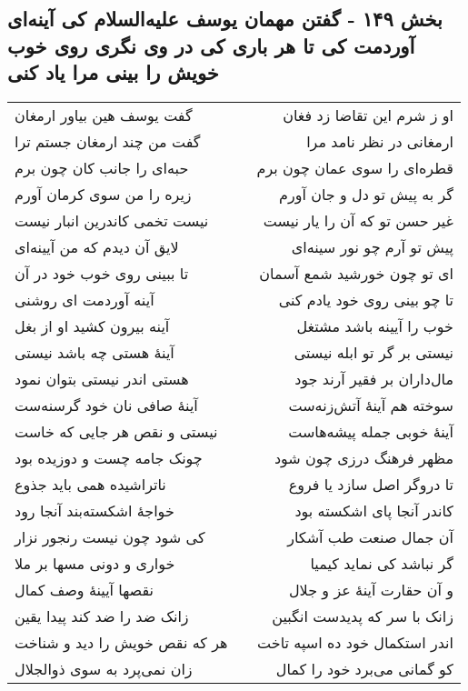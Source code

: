 \begin{center}
\section*{بخش ۱۴۹ - گفتن مهمان یوسف علیه‌السلام کی آینه‌ای آوردمت کی تا هر باری کی در وی نگری روی خوب خویش را بینی مرا یاد کنی}
\label{sec:sh149}
\begin{longtable}{l p{0.5cm} r}
گفت یوسف هین بیاور ارمغان
&&
او ز شرم این تقاضا زد فغان
\\
گفت من چند ارمغان جستم ترا
&&
ارمغانی در نظر نامد مرا
\\
حبه‌ای را جانب کان چون برم
&&
قطره‌ای را سوی عمان چون برم
\\
زیره را من سوی کرمان آورم
&&
گر به پیش تو دل و جان آورم
\\
نیست تخمی کاندرین انبار نیست
&&
غیر حسن تو که آن را یار نیست
\\
لایق آن دیدم که من آیینه‌ای
&&
پیش تو آرم چو نور سینه‌ای
\\
تا ببینی روی خوب خود در آن
&&
ای تو چون خورشید شمع آسمان
\\
آینه آوردمت ای روشنی
&&
تا چو بینی روی خود یادم کنی
\\
آینه بیرون کشید او از بغل
&&
خوب را آیینه باشد مشتغل
\\
آینهٔ هستی چه باشد نیستی
&&
نیستی بر گر تو ابله نیستی
\\
هستی اندر نیستی بتوان نمود
&&
مال‌داران بر فقیر آرند جود
\\
آینهٔ صافی نان خود گرسنه‌ست
&&
سوخته هم آینهٔ آتش‌زنه‌ست
\\
نیستی و نقص هر جایی که خاست
&&
آینهٔ خوبی جمله پیشه‌هاست
\\
چونک جامه چست و دوزیده بود
&&
مظهر فرهنگ درزی چون شود
\\
ناتراشیده همی باید جذوع
&&
تا دروگر اصل سازد یا فروع
\\
خواجهٔ اشکسته‌بند آنجا رود
&&
کاندر آنجا پای اشکسته بود
\\
کی شود چون نیست رنجور نزار
&&
آن جمال صنعت طب آشکار
\\
خواری و دونی مسها بر ملا
&&
گر نباشد کی نماید کیمیا
\\
نقصها آیینهٔ وصف کمال
&&
و آن حقارت آینهٔ عز و جلال
\\
زانک ضد را ضد کند پیدا یقین
&&
زانک با سر که پدیدست انگبین
\\
هر که نقص خویش را دید و شناخت
&&
اندر استکمال خود ده اسپه تاخت
\\
زان نمی‌پرد به سوی ذوالجلال
&&
کو گمانی می‌برد خود را کمال

\end{longtable}
\end{center}
